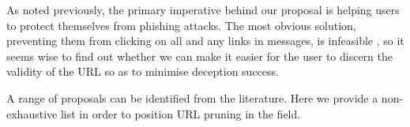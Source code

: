 As noted previously, the primary imperative behind our proposal is helping users to protect themselves from  phishing attacks. 
The most obvious solution, preventing them from clicking on all and any links in messages, is infeasible \cite{mohebzada2012phishing}, so it seems wise to find out whether we can   make it easier for the user  to discern the validity of   the URL so as to minimise deception success.




A range of proposals can be identified from the literature.
Here we provide a non-exhaustive list in order to position URL pruning in the field. 

